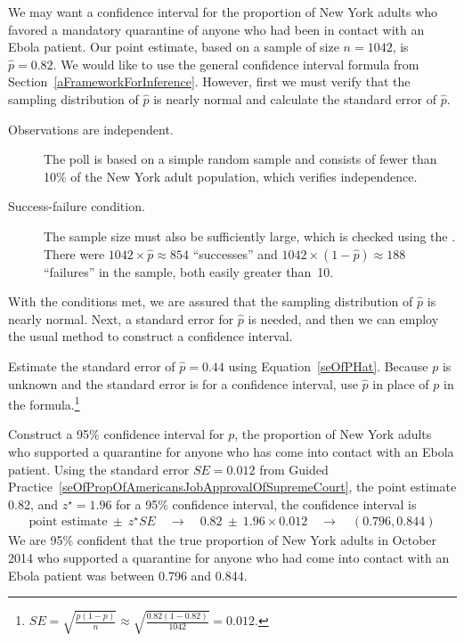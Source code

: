 We may want a confidence interval for the proportion of New York adults who favored a mandatory quarantine of anyone who had been in contact with an Ebola patient. Our point estimate, based on a sample of size $n = 1042$, is $\hat{p} = 0.82$. We would like to use the general confidence interval formula from Section~\ref{aFrameworkForInference}. However, first we must verify that the sampling distribution of $\hat{p}$ is nearly normal and calculate the standard error of $\hat{p}$.
\begin{description}
\item[Observations are independent.] The poll is based on a simple random sample and consists of fewer than 10\% of the New York adult population, which verifies independence.
\item[Success-failure condition.] The sample size must also be sufficiently large, which is checked using the . There were $1042 \times \hat{p} \approx 854$ ``successes'' and $1042 \times (1 - \hat{p}) \approx 188$ ``failures'' in the sample, both easily greater than~10.
\end{description}
With the conditions met, we are assured that the sampling distribution of $\hat{p}$ is nearly normal. Next, a standard error for $\hat{p}$ is needed, and then we can employ the usual method to construct a confidence interval.

\begin{exercise} \label{seOfPropOfAmericansJobApprovalOfSupremeCourt}
Estimate the standard error of $\hat{p}=0.44$ using Equation~\eqref{seOfPHat}. Because $p$ is unknown and the standard error is for a confidence interval, use $\hat{p}$ in place of $p$ in the formula.\footnote{$SE = \sqrt{\frac{p(1-p)}{n}} \approx \sqrt{\frac{0.82 (1 - 0.82)}{1042}} = 0.012$.}
\end{exercise}

\begin{example}{Construct a 95\% confidence interval for $p$, the proportion of New York adults who supported a quarantine for anyone who has come into contact with an Ebola patient.}
Using the standard error $SE = 0.012$ from Guided Practice~\ref{seOfPropOfAmericansJobApprovalOfSupremeCourt}, the point estimate 0.82, and $z^{\star} = 1.96$ for a 95\% confidence interval, the confidence interval is
\begin{eqnarray*}
\text{point estimate} \ \pm\ z^{\star}SE \quad\to\quad 0.82 \ \pm\ 1.96\times 0.012 \quad\to\quad (0.796, 0.844)
\end{eqnarray*}
We are 95\% confident that the true proportion of New York adults in October 2014 who supported a quarantine for anyone who had come into contact with an Ebola patient was between 0.796 and 0.844.


\end{example}

